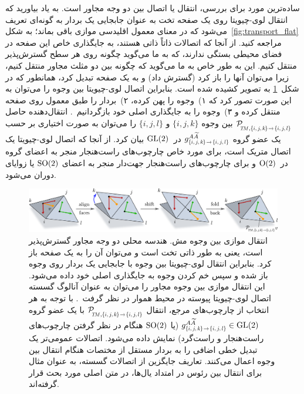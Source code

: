 ساده‌ترین مورد برای بررسی، انتقال یا اتصال بین دو وجه مجاور است.
به یاد بیاورید که انتقال لوی-چیویتا روی یک صفحه تخت به عنوان جابجایی یک بردار به گونه‌ای تعریف می‌شود که در معنای معمول اقلیدسی موازی باقی بماند؛ به شکل~\ref{fig:transport_flat} مراجعه کنید.
از آنجا که اتصالات ذاتاً ذاتی هستند، به جایگذاری خاص این صفحه در فضای محیطی بستگی ندارند، که به ما می‌گوید چگونه روی هر سطح گسترش‌پذیر منتقل کنیم.
این به طور خاص به ما می‌گوید که چگونه بین دو مثلث مجاور منتقل کنیم، زیرا می‌توان آنها را باز کرد (گسترش داد) و به یک صفحه تبدیل کرد، همانطور که در شکل~\ref{fig:transport_mesh} به تصویر کشیده شده است.
بنابراین اتصال لوی-چیویتا بین وجوه را می‌توان به این صورت تصور کرد که
۱)~وجوه را پهن کرده،
۲)~بردار را طبق معمول روی صفحه منتقل کرده و
۳)~وجوه را به جایگذاری اصلی خود بازگردانیم~\cite{craneTrivialConnectionsDiscrete2010,mitchell1987discrete,craneDiscreteDifferentialGeometry2014}.
انتقال‌دهنده حاصل
$\mathcal{P}_{\mkern-2mu\overset{}{\protect\scalebox{.62}{$\!T\!M$},\protect\scalebox{.68}{$\{i,j,k\mkern-1mu\}\!\to\!\{i,j,l\}$}}}$
بین وجوه $\{i,j,k\}$ و $\{i,j,l\}$ را می‌توان به صورت اختیاری بر حسب یک عضو گروه
$g^{A\widetilde{A}}_{\protect\scalebox{.68}{$\{i,j,k\mkern-1mu\}\!\to\!\{i,j,l\}$}}$ در~$\operatorname{GL}(2)$ بیان کرد.
از آنجا که اتصال لوی-چیویتا یک اتصال متریک است، برای مورد خاص چارچوب‌های راست‌هنجار منجر به اعضای گروه در~$\operatorname{O}(2)$ و برای چارچوب‌های راست‌هنجار جهت‌دار منجر به اعضای $\operatorname{SO}(2)$ یا زوایای دوران می‌شود.

\begin{figure}
    \centering
    \includegraphics[width=1.\textwidth]{figures/transport_mesh.pdf}
    \caption{\small
        انتقال موازی بین وجوه مش.
        هندسه محلی دو وجه مجاور گسترش‌پذیر است، یعنی به طور ذاتی تخت است و می‌توان آن را به یک صفحه باز کرد.
        بنابراین انتقال لوی-چیویتا بین وجوه با جابجایی یک بردار روی وجوه باز شده و سپس خم کردن وجوه به جایگذاری اصلی خود داده می‌شود.
        این انتقال موازی بین وجوه مجاور را می‌توان به عنوان آنالوگ گسسته اتصال لوی-چیویتا پیوسته در محیط هموار در نظر گرفت~\cite{craneTrivialConnectionsDiscrete2010}.
        با توجه به هر انتخاب از چارچوب‌های مرجع، انتقال
        $\mathcal{P}_{\mkern-2mu\overset{}{\protect\scalebox{.62}{$\!T\!M$},\protect\scalebox{.68}{$\{i,j,k\mkern-1mu\}\!\to\!\{i,j,l\}$}}}$
        با یک عضو گروه
        $g^{A\widetilde{A}}_{\protect\scalebox{.68}{$\{i,j,k\mkern-1mu\}\!\to\!\{i,j,l\}$}} \in \GL{2}$ (یا $\operatorname{SO}(2)$ هنگام در نظر گرفتن چارچوب‌های راست‌هنجار و راست‌گرد) نمایش داده می‌شود.
        اتصالات عمومی‌تر یک تبدیل خطی اضافی را به بردار مستقل از مختصات هنگام انتقال بین وجوه اعمال می‌کنند.
        تعاریف جایگزین از اتصالات گسسته، به عنوان مثال برای انتقال بین رئوس در امتداد یال‌ها، در متن اصلی مورد بحث قرار گرفته‌اند.
    }
    \label{fig:transport_mesh}
\end{figure}


